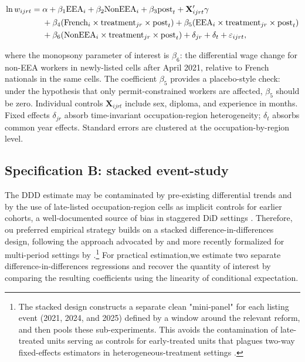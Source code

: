 \documentclass[9pt]{article}
\begin{document}
\begin{align}
\ln w_{ijrt} = \;& \alpha + \beta_1 \mathrm{EEA}_i + \beta_2 \mathrm{NonEEA}_i
  + \beta_3 \mathrm{post}_t + \mathbf{X}'_{ijrt}\gamma \notag \\
  &+ \beta_4 (\mathrm{French}_i \times \mathrm{treatment}_{jr} \times \mathrm{post}_t)
   + \beta_5 (\mathrm{EEA}_i \times \mathrm{treatment}_{jr} \times \mathrm{post}_t) \notag \\
  &+ \beta_6 (\mathrm{NonEEA}_i \times \mathrm{treatment}_{jr} \times \mathrm{post}_t)
   + \delta_{jr} + \delta_t + \varepsilon_{ijrt},
\label{eq:ddd}
\end{align}

\noindent where the monopsony parameter of interest is $\beta_6$: the differential
wage change for non-EEA workers in newly-listed cells after April 2021, relative to
French nationals in the same cells. The coefficient $\beta_5$ provides a placebo-style
check: under the hypothesis that only permit-constrained workers are affected,
$\beta_5$ should be zero. Individual controls $\mathbf{X}_{ijrt}$ include sex, diploma,
and experience in months. Fixed effects $\delta_{jr}$ absorb time-invariant
occupation-region heterogeneity; $\delta_t$ absorbs common year effects. Standard
errors are clustered at the occupation-by-region level.

\subsection{Specification B: stacked event-study}

The DDD estimate may be contaminated by pre-existing differential trends and by
the use of late-listed occupation-region cells as implicit controls for earlier
cohorts, a well-documented source of bias in staggered DiD settings
\citep{Callaway2021, Sun2021}.
Therefore, ou preferred empirical strategy builds on a stacked difference-in-differences design,
following the approach advocated by \citet{Cengiz2019} and more recently
formalized for multi-period settings by \citet{Baker2022}.\footnote{%
  The stacked design constructs a separate clean "mini-panel" for each
  listing event (2021, 2024, and 2025) defined by a window
  around the relevant reform, and then pools these sub-experiments.
  This avoids the contamination of late-treated units serving as controls
  for early-treated units that plagues two-way fixed-effects estimators
  in heterogeneous-treatment settings \citep{Callaway2021, Sun2021}.}
For practical estimation,we estimate two separate difference-in-differences regressions
and recover the quantity of interest by comparing the resulting coefficients using the linearity of
conditional expectation.
\end{document}
